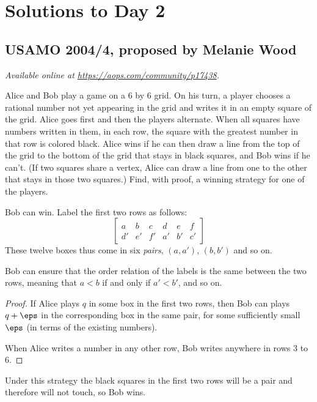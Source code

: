 \documentclass[11pt]{scrartcl}
\begin{document}
\section{Solutions to Day 2}
\subsection{USAMO 2004/4, proposed by Melanie Wood}
\textsl{Available online at \url{https://aops.com/community/p17438}.}
\begin{mdframed}[style=mdpurplebox,frametitle={Problem statement}]
Alice and Bob play a game on a $6$ by $6$ grid.
On his turn, a player chooses a rational number not yet appearing in the grid
and writes it in an empty square of the grid.
Alice goes first and then the players alternate.
When all squares have numbers written in them, in each row,
the square with the greatest number in that row is colored black.
Alice wins if he can then draw a line from the top of the grid to the bottom of the grid
that stays in black squares, and Bob wins if he can't.
(If two squares share a vertex,
Alice can draw a line from one to the other that stays in those two squares.)
Find, with proof, a winning strategy for one of the players.
\end{mdframed}
Bob can win.
Label the first two rows as follows:
\[
  \begin{bmatrix}
    a & b & c & d & e & f \\
    d' & e' & f' & a' & b' & c'
  \end{bmatrix}
\]
These twelve boxes thus come in six \emph{pairs}, $(a, a')$, $(b, b')$ and so on.

\begin{claim*}
  Bob can ensure that the order relation
  of the labels is the same between the two rows,
  meaning that $a < b$ if and only if $a' < b'$, and so on.
\end{claim*}
\begin{proof}
  If Alice plays $q$ in some box in the first two rows, then Bob can plays $q + \eps$
  in the corresponding box in the same pair, for some sufficiently small $\eps$
  (in terms of the existing numbers).

  When Alice writes a number in any other row, Bob writes anywhere in rows $3$ to $6$.
\end{proof}

Under this strategy the black squares in the first two rows will be a pair
and therefore will not touch, so Bob wins.
\pagebreak
\end{document}
